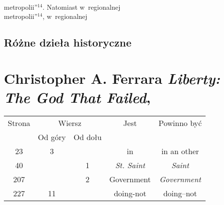 \documentclass[a4paper,11pt]{article}
\numberwithin{equation}{section}
\begin{document}
\VerSpaceTwo


\noindent
{} \\
\Jest metropolii”$^{ 14 }$. Natomiast w~regionalnej \\
\PowinnoByc metropolii”$^{ 14 }$, w~regionalnej \\












\subsection{Różne dzieła historyczne}

\VerSpaceThree



\section{Christopher A. Ferrara
  \textit{Liberty: The God That Failed}, \cite{}}




\begin{center}

  \begin{tabular}{|c|c|c|c|c|}
    \hline
    Strona & \multicolumn{2}{c|}{Wiersz} & Jest
                              & Powinno być \\ \cline{2-3}
    & Od góry & Od dołu & & \\
    \hline
    23  &  3 & & in & in an other \\
    40  & &  1 & \textit{St. Saint} & \textit{Saint} \\
    207 & &  2 & Government & \textit{Government} \\
    227 & 11 & & doing-not & doing--not \\
    \hline
  \end{tabular}

\end{center}

\VerSpaceTwo
\end{document}
